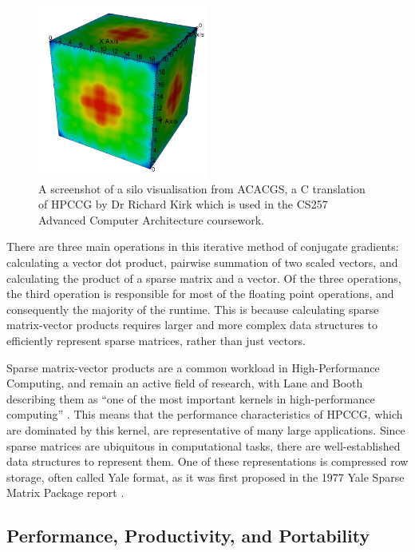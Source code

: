 \begin{figure}[H]
    \centering
    \includegraphics[width=0.5\textwidth]{images/2_background/acacgs_silo_output.png}
    \caption{A screenshot of a silo visualisation from ACACGS, a C translation of HPCCG by Dr Richard Kirk which is used in the CS257 Advanced Computer Architecture coursework.}
    \label{fig:acacgs_silo_output}
\end{figure}

There are three main operations in this iterative method of conjugate gradients: calculating a vector dot product, pairwise summation of two scaled vectors, and calculating the product of a sparse matrix and a vector. Of the three operations, the third operation is responsible for most of the floating point operations, and consequently the majority of the runtime. This is because calculating sparse matrix-vector products requires larger and more complex data structures to efficiently represent sparse matrices, rather than just vectors.

Sparse matrix-vector products are a common workload in High-Performance Computing, and remain an active field of research, with Lane and Booth describing them as ``one of the most important kernels in high-performance computing'' \cite{laneHeterogeneousSparseMatrixVector2023}. This means that the performance characteristics of HPCCG, which are dominated by this kernel, are representative of many large applications. Since sparse matrices are ubiquitous in computational tasks, there are well-established data structures to represent them. One of these representations is compressed row storage, often called Yale format, as it was first proposed in the 1977 Yale Sparse Matrix Package report \cite{eisenstat1977yale}.

\subsection{Performance, Productivity, and Portability}
\label{ssec:p3hpc}


